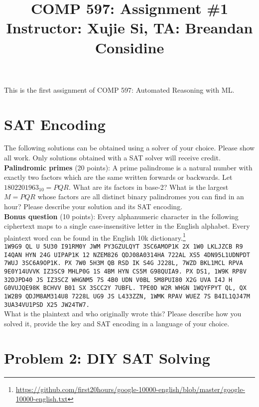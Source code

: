 \documentclass[11pt]{article}
\title{COMP 597: Assignment \#1\\\vspace{10pt}\small{Instructor: Xujie Si, TA: Breandan Considine}}
\begin{document}
    \maketitle
    \noindent This is the first assignment of COMP 597: Automated Reasoning with ML.

    \section{SAT Encoding}

    The following solutions can be obtained using a solver of your choice. Please show all work. Only solutions obtained with a SAT solver will receive credit.\\

    \noindent \textbf{Palindromic primes} (20 points): A prime palindrome is a natural number with exactly two factors which are the same written forwards or backwards. Let $1802201963_{10} = PQR$. What are its factors in base-2? What is the largest $M=PQR$ whose factors are all distinct binary palindromes you can find in an hour? Please describe your solution and its SAT encoding.\\

    \noindent \textbf{Bonus question} (10 points): Every alphanumeric character in the following ciphertext maps to a single case-insensitive letter in the English alphabet. Every plaintext word can be found in the English 10k dictionary.\footnote{\url{https://github.com/first20hours/google-10000-english/blob/master/google-10000-english.txt}}\\

    \noindent \tiny\texttt{1W9G9 QL U 5U30 I91RM0Y JWM PY3GZULQYT 3SC6AMOP1K 2X 1W0 LKLJZCB R9 I4QAN HYN 24G UIPAP1K 12 NZEM826 QDJ08A0314HA 722AL XS5 4DN95L1UDNPDT 7WUJ 3SC6A9OP1K. PX 7W0 5H3M QB RSD IK S4G J228L, 7WZD BKL1MCL RPVA 9E0Y14UVVK IZ3SC9 MHLP0G 1S 4BM HYN CS5M G98QUIA9. PX DS1, 1W9K RP8V 32DJPD40 JS IZ3SCZ WHGNM5 7S 4B0 UDN V0BL 5M8PUI80 X2G UVA I4J H G0VUJQE98K BCHVV B01 SX 3SCC2Y 7UBFL. TPE0D W2R WHGN 1WQYFPYT QL, QX 1W2B9 QDJM8AM314U8 7228L UG9 JS L433ZZN, 1WMK RPAV WUEZ 7S B4IL1QJ47M 3UA34VU1PSD X25 JW24TW7.}\normalsize\\

    \noindent What is the plaintext and who originally wrote this? Please describe how you solved it, provide the key and SAT encoding in a language of your choice.

    \pagebreak\section{Problem 2: DIY SAT Solving}
\end{document}
